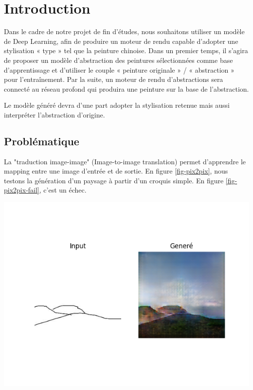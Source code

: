 \documentclass[a4paper, 12pt]{report}
\begin{document}
\chapter*{Introduction}


Dans le cadre de notre projet de fin d'études, nous souhaitons utiliser un modèle de Deep Learning, afin de produire un moteur de rendu capable d’adopter une stylisation « type » tel que la peinture chinoise. Dans un premier temps, il s’agira de proposer un modèle d’abstraction des peintures sélectionnées comme base d’apprentissage et d’utiliser le couple « peinture originale » / « abstraction » pour l’entraînement. Par la suite, un moteur de rendu d’abstractions sera connecté au réseau profond qui produira une peinture sur la base de l’abstraction.

Le modèle généré devra d'une part adopter la stylisation retenue mais aussi interpréter l'abstraction d'origine.

\section{Problématique}

La "traduction image-image" (Image-to-image translation) permet d'apprendre le mapping entre une image d'entrée et de sortie. En figure \ref{fig-pix2pix}, nous testons la génération d'un paysage à partir d'un croquis simple. En figure \ref{fig-pix2pix-fail}, c'est un échec.

\begin{center}
\includegraphics[width=0.7\linewidth]{images/pix2pix-t1.png}
\label{fig-pix2pix}
\end{center}
\end{document}
